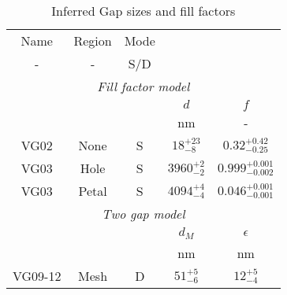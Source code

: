 \begin{table}[h!]
\caption{Inferred Gap sizes and fill factors \label{tbl_DerivedGapSizes}}
\begin{center}
    \begin{tabular}{ c c c c c }
    \hline
    Name & Region & Mode &  &  \\ 
    -  & - & S/D &  &  \\
    \hline
    \multicolumn{5}{c}{\emph{Fill factor model}} \\
    \hline
    \multicolumn{3}{c}{} & $d$ & $f$ \\
    \multicolumn{3}{c}{} & nm & - \\
    \cline{4-5}
    VG02 & None    &   S  & $18^{+23}_{-8}$ & $0.32^{+0.42}_{-0.25}$\\
    VG03 & Hole    &   S  & $3960^{+2}_{-2}$ &  $0.999^{+0.001}_{-0.002}$\\
    VG03 & Petal   &   S  & $4094^{+4}_{-4}$ &  $0.046^{+0.001}_{-0.001}$\\
    \hline
    \multicolumn{5}{c}{\emph{Two gap model}} \\
    \hline
    \multicolumn{3}{c}{} & $d_M$ & $\epsilon$ \\
    \multicolumn{3}{c}{} & nm    & nm \\
    \cline{4-5}
    VG09-12 & Mesh    &   D & $51^{+5}_{-6}  $ &  $12^{+5}_{-4}$\\
    \hline
    \end{tabular}
\end{center}
\end{table}